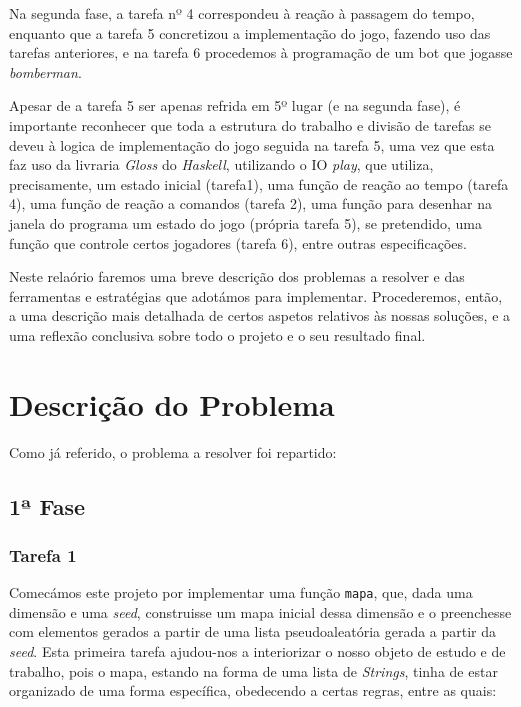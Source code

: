 \documentclass[a4paper]{article}
\begin{document}
  Na segunda fase, a tarefa nº 4 correspondeu à reação à passagem do tempo,
  enquanto que a tarefa 5 concretizou a implementação do jogo, fazendo uso das 
  tarefas anteriores, e na tarefa 6 procedemos à programação de um bot que 
  jogasse \textit{bomberman}.

  Apesar de a tarefa 5 ser apenas refrida em 5º lugar (e na segunda fase), é
  importante reconhecer que toda a estrutura do trabalho e divisão de tarefas
  se deveu à logica de implementação do jogo seguida na tarefa 5, uma vez que
  esta faz uso da livraria \emph{Gloss} do \emph{Haskell}, utilizando o IO 
  \emph{play}, que utiliza, precisamente, um estado inicial (tarefa1), uma 
  função de reação ao tempo (tarefa 4), uma função de reação a comandos (tarefa
  2), uma função para desenhar na janela do programa um estado do jogo (própria 
  tarefa 5), se pretendido, uma função que controle certos jogadores (tarefa 6),
  entre outras especificações. 

  Neste relaório faremos uma breve descrição dos problemas a resolver e das
  ferramentas e estratégias que adotámos para implementar. Procederemos, então,
  a uma descrição mais detalhada de certos aspetos relativos às nossas soluções,
  e a uma reflexão conclusiva sobre todo o projeto e o seu resultado final.


\pagebreak










\section{Descrição do Problema}


Como já referido, o problema a resolver foi repartido:

\subsection{1ª Fase}





\subsubsection{Tarefa 1}

    \hspace{0.54cm}Comecámos este projeto por implementar uma função \texttt{mapa}, que, dada uma dimensão 
    e uma \textit{seed}, construisse um mapa inicial dessa dimensão e o preenchesse com elementos
    gerados a partir de uma lista pseudoaleatória gerada a partir da \textit{seed}.
    Esta primeira tarefa ajudou-nos a interiorizar o nosso objeto de estudo e de trabalho, pois
    o mapa, estando na forma de uma lista de \textit{Strings}, tinha de estar organizado de uma
    forma específica, obedecendo a certas regras, entre as quais:
\end{document}
